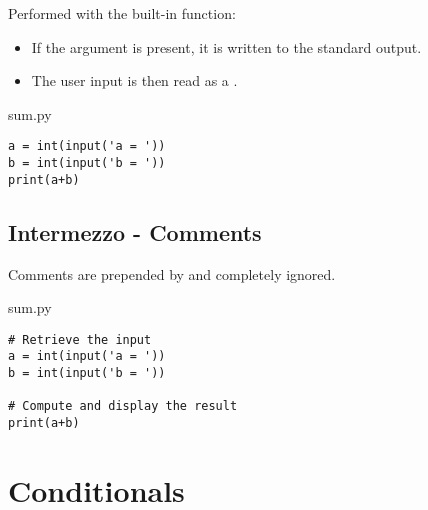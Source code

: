 \documentclass[aspectratio=1610,t]{beamer}
\begin{document}
\begin{pframe}
Performed with the  built-in function:
 \begin{itemize}
  \item If the  argument is present, it is written to the standard
        output.
  \item The user input is then read as a .
 \end{itemize}
 \begin{minipage}{0.40\textwidth}
 \begin{pythonfile}{sum.py}
  \begin{verbatim}
a = int(input('a = '))
b = int(input('b = '))
print(a+b)
  \end{verbatim}
 \end{pythonfile}
 \begin{terminal}
 \end{terminal}
 \end{minipage}%
 \pause
 \begin{minipage}{0.57\textwidth}
 \begin{center}
  
 \end{center}
 \end{minipage}%
\end{pframe}


\subsection{Intermezzo - Comments}
\begin{pframe}
 Comments are prepended by \emp{\#} and completely ignored.
 \begin{pythonfile}{sum.py}
  \begin{verbatim}
# Retrieve the input
a = int(input('a = '))
b = int(input('b = '))

# Compute and display the result
print(a+b)
  \end{verbatim}
 \end{pythonfile}
\end{pframe}

\section{Conditionals}
\makeTableOfContentsSection
\end{document}
